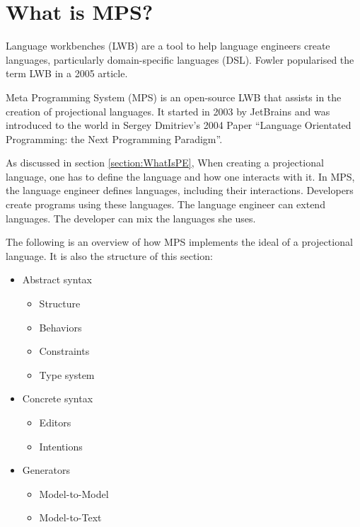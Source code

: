 \section{What is MPS?}
\label{section:MPS}

Language workbenches (LWB) are a tool to help language engineers create languages, particularly domain-specific languages (DSL).
Fowler\cite{Fowler_lwb} popularised the term LWB in a 2005 article.

Meta Programming System (MPS) is an open-source LWB that assists in the creation of projectional languages.
It started in 2003 by JetBrains and was introduced to the world in Sergey Dmitriev's 2004 Paper ``Language Orientated Programming: the Next Programming Paradigm''\cite{dmitriev2004language}.

As discussed in section \ref{section:WhatIsPE}, When creating a projectional language, one has to define the language and how one interacts with it.
In MPS, the language engineer defines languages, including their interactions.
Developers create programs using these languages.
The language engineer can extend languages.
The developer can mix the languages she uses.

The following is an overview of how MPS implements the ideal of a projectional language.
It is also the structure of this section: 

\begin{itemize}
    \setlength\itemsep{0em}
    \item Abstract syntax
    \begin{itemize}
        \setlength\itemsep{0em}
        \item Structure
        \item Behaviors
        \item Constraints
        \item Type system
    \end{itemize}
    \item Concrete syntax
    \begin{itemize}
        \setlength\itemsep{0em}
        \item Editors
        \item Intentions
    \end{itemize}
    \item Generators
    \begin{itemize}
        \setlength\itemsep{0em}
        \item Model-to-Model
        \item Model-to-Text
    \end{itemize}
\end{itemize}

